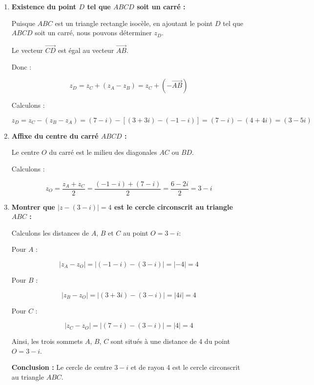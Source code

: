 \documentclass[a4paper,12pt]{article}
\begin{document}
\begin{solutionbox}
\begin{enumerate}
    Vérifions le théorème de Pythagore :

    \[
    AB^2 + BC^2 = 32 + 32 = 64 = AC^2
    \]

    Donc, le triangle \( ABC \) est rectangle en \( B \).

    \textbf{Conclusion :} Le triangle \( ABC \) est isocèle rectangle en \( B \).

    \item \textbf{Existence du point \( D \) tel que \( ABCD \) soit un carré :}

    Puisque \( ABC \) est un triangle rectangle isocèle, en ajoutant le point \( D \) tel que \( ABCD \) soit un carré, nous pouvons déterminer \( z_D \).

    Le vecteur \( \overrightarrow{CD} \) est égal au vecteur \( \overrightarrow{AB} \).

    Donc :

    \[
    z_D = z_C + (z_A - z_B) = z_C + (-\overrightarrow{AB})
    \]

    Calculons :

    \[
    z_D = z_C - (z_B - z_A) = (7 - i) - [(3 + 3i) - (-1 - i)] = (7 - i) - (4 + 4i) = (3 - 5i)
    \]

    \item \textbf{Affixe du centre du carré \( ABCD \) :}

    Le centre \( O \) du carré est le milieu des diagonales \( AC \) ou \( BD \).

    Calculons :

    \[
    z_O = \dfrac{z_A + z_C}{2} = \dfrac{(-1 - i) + (7 - i)}{2} = \dfrac{6 - 2i}{2} = 3 - i
    \]

    \item \textbf{Montrer que \( |z - (3 - i)| = 4 \) est le cercle circonscrit au triangle \( ABC \) :}

    Calculons les distances de \( A \), \( B \) et \( C \) au point \( O = 3 - i \):

    Pour \( A \) :

    \[
    |z_A - z_O| = |(-1 - i) - (3 - i)| = |-4| = 4
    \]

    Pour \( B \) :

    \[
    |z_B - z_O| = |(3 + 3i) - (3 - i)| = |4i| = 4
    \]

    Pour \( C \) :

    \[
    |z_C - z_O| = |(7 - i) - (3 - i)| = |4| = 4
    \]

    Ainsi, les trois sommets \( A \), \( B \), \( C \) sont situés à une distance de 4 du point \( O = 3 - i \).

    \textbf{Conclusion :} Le cercle de centre \( 3 - i \) et de rayon 4 est le cercle circonscrit au triangle \( ABC \).
\end{enumerate}
\end{solutionbox}
\end{document}

